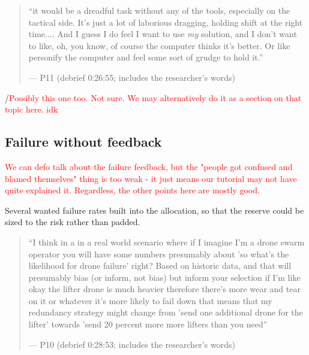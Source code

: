 \begin{quote}\small
``it would be a dreadful task without any of the tools, especially on the tactical side. It's just a lot of laborious dragging, holding shift at the right time.... And I guess I do feel I want to use \textit{my} solution, and I don't want to like, oh, you know, of course the computer thinks it's better. Or like personify the computer and feel some sort of grudge to hold it.''\par\hfill--- P11 (debrief 0:26:55; includes the researcher's words)
\end{quote}
/\textcolor{red}{Possibly this one too. Not sure. We may alternatively do it as a section on that topic here. idk}

\clearpage


\subsection{Failure without feedback}\label{sec:qual:failure}
\textcolor{red}{We can defo talk about the failure feedback, but the "people got confused and blamed themselves" thing is too weak - it just means our tutorial may not have quite explained it. Regardless, the other points here are mostly good.}


\label{sec:qual:failure:blind}
Several wanted failure rates built into the allocation, so that the reserve could be sized to the risk rather than padded.

\begin{quote}\small
``I think in a in a real world scenario where if I imagine I'm a drone swarm operator you will have some numbers presumably about 'so what's the likelihood for drone failure' right? Based on historic data, and that will presumably bias (or inform, not bias) but inform your selection if I'm like okay the lifter drone is much heavier therefore there's more wear and tear on it or whatever it's more likely to fail down that means that my redundancy strategy might change from 'send one additional drone for the lifter' towards 'send 20 percent more more lifters than you need''\par\hfill--- P10 (debrief 0:28:53; includes the researcher's words)
\end{quote}

\clearpage


